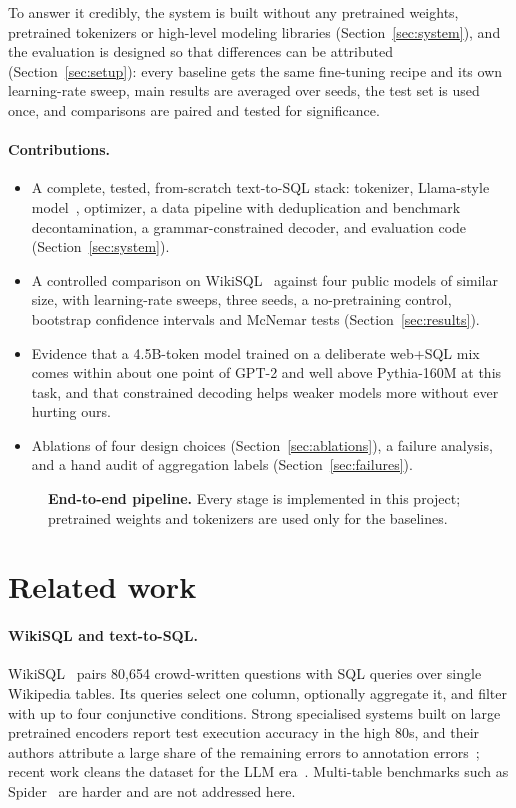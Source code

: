 \documentclass[11pt]{article}
\begin{document}
To answer it credibly, the system is built without any pretrained weights, pretrained tokenizers or high-level modeling libraries (Section~\ref{sec:system}), and the evaluation is designed so that differences can be attributed (Section~\ref{sec:setup}): every baseline gets the same fine-tuning recipe and its own learning-rate sweep, main results are averaged over seeds, the test set is used once, and comparisons are paired and tested for significance.

\paragraph{Contributions.}
\begin{itemize}
  \item A complete, tested, from-scratch text-to-SQL stack: tokenizer, Llama-style model~\cite{touvron2023llama}, optimizer, a data pipeline with deduplication and benchmark decontamination, a grammar-constrained decoder, and evaluation code (Section~\ref{sec:system}).
  \item A controlled comparison on WikiSQL~\cite{zhong2017seq2sql} against four public models of similar size, with learning-rate sweeps, three seeds, a no-pretraining control, bootstrap confidence intervals and McNemar tests (Section~\ref{sec:results}).
  \item Evidence that a 4.5B-token model trained on a deliberate web+SQL mix comes within about one point of GPT-2 and well above Pythia-160M at this task, and that constrained decoding helps weaker models more without ever hurting ours.
  \item Ablations of four design choices (Section~\ref{sec:ablations}), a failure analysis, and a hand audit of aggregation labels (Section~\ref{sec:failures}).
\end{itemize}

\begin{figure}[!htbp]
\centering
\resizebox{\linewidth}{!}{}
\caption{\textbf{End-to-end pipeline.} Every stage is implemented in this project; pretrained weights and tokenizers are used only for the baselines.}
\label{fig:pipeline}
\end{figure}

\section{Related work}

\paragraph{WikiSQL and text-to-SQL.} WikiSQL~\cite{zhong2017seq2sql} pairs 80,654 crowd-written questions with SQL queries over single Wikipedia tables. Its queries select one column, optionally aggregate it, and filter with up to four conjunctive conditions. Strong specialised systems built on large pretrained encoders report test execution accuracy in the high 80s, and their authors attribute a large share of the remaining errors to annotation errors~\cite{hwang2019sqlova}; recent work cleans the dataset for the LLM era~\cite{pihulski2025llmsql}. Multi-table benchmarks such as Spider~\cite{yu2018spider} are harder and are not addressed here.
\end{document}
